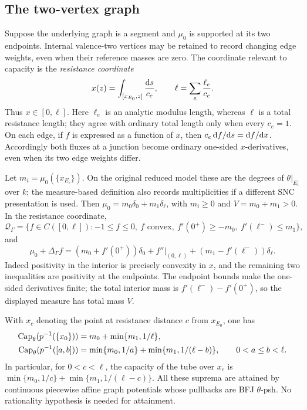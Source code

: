\subsection{The two-vertex graph}
\label{sec:ch25-two-vertex}

Suppose the underlying graph is a segment and \(\mu_0\) is supported
at its two endpoints.  Internal valence-two vertices may be retained
to record changing edge weights, even when their reference masses
are zero.  The coordinate relevant to capacity is the
\emph{resistance coordinate}
\begin{equation}
\label{eq:ch25-resistance-coordinate}
 x(z)=\int_{[x_{E_0},z]}\frac{\mathrm d s}{c_e},\qquad
 \ell=\sum_e\frac{\ell_e}{c_e}.
\end{equation}
Thus \(x\in[0,\ell]\).  Here \(\ell_e\) is an analytic modulus
length, whereas \(\ell\) is a total resistance length; they agree
with ordinary total length only when every \(c_e=1\).
On each edge, if \(f\) is expressed as a function of \(x\), then
\(c_e\,\mathrm d f/\mathrm d s=\mathrm d f/\mathrm d x\).
Accordingly both fluxes at a junction become ordinary one-sided
\(x\)-derivatives, even when its two edge weights differ.

Let \(m_i=\mu_0(\{x_{E_i}\})\).  On the original reduced model these
are the degrees of \(\theta|_{E_i}\) over \(k\); the measure-based
definition also records multiplicities if a different SNC
presentation is used.  Then
\(\mu_0=m_0\delta_0+m_1\delta_\ell\), with \(m_i\geq0\) and
\(V=m_0+m_1>0\).
In the resistance coordinate,
\begin{equation}
\label{eq:ch25-segment-class}
 \mathcal Q_\Gamma
 =\{f\in C([0,\ell]): -1\leq f\leq0,\ f\text{ convex},\
       f'(0^+)\geq-m_0,\ f'(\ell^-)\leq m_1\},
\end{equation}
and
\begin{equation}
\label{eq:ch25-segment-measure}
 \mu_0+\Delta_\Gamma f
  =(m_0+f'(0^+))\delta_0
       +f''|_{(0,\ell)}+(m_1-f'(\ell^-))\delta_\ell .
\end{equation}
Indeed positivity in the interior is precisely convexity in \(x\),
and the remaining two inequalities are positivity at the endpoints.
The endpoint bounds make the one-sided derivatives finite; the
total interior mass is \(f'(\ell^-)-f'(0^+)\), so the displayed
measure has total mass \(V\).

\begin{proposition}
\label{prop:ch25-segment-capacities}
With \(x_c\) denoting the point at resistance distance \(c\) from
\(x_{E_0}\), one has
\begin{align}
\label{eq:ch25-cap-endpoint}
 \operatorname{Cap}_\theta(p^{-1}(\{x_0\}))
   &=m_0+\min\{m_1,1/\ell\},\\
\label{eq:ch25-cap-interval}
 \operatorname{Cap}_\theta(p^{-1}([a,b]))
   &=\min\{m_0,1/a\}+\min\{m_1,1/(\ell-b)\},
       \qquad 0<a\leq b<\ell.
\end{align}
In particular, for \(0<c<\ell\), the capacity of the tube over
\(x_c\) is \(\min\{m_0,1/c\}+\min\{m_1,1/(\ell-c)\}\).
All these suprema are attained by continuous piecewise affine graph
potentials whose pullbacks are BFJ \(\theta\)-psh.
No rationality hypothesis is needed for attainment.
\end{proposition}

